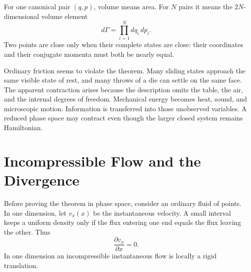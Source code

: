 For one canonical pair \((q,p)\), volume means area. For \(N\) pairs it means
the \(2N\)-dimensional volume element
\begin{equation}
 d\Gamma=\prod_{i=1}^{N}dq_i\,dp_i.
 \label{eq:l07-phase-volume-element}
\end{equation}
Two points are close only when their complete states are close: their
coordinates and their conjugate momenta must both be nearly equal.

\begin{classroomqa}
\end{classroomqa}

Ordinary friction seems to violate the theorem. Many sliding states approach
the same visible state of rest, and many throws of a die can settle on the
same face. The apparent contraction arises because the description omits the
table, the air, and the internal degrees of freedom. Mechanical energy becomes
heat, sound, and microscopic motion. Information is transferred into those
unobserved variables. A reduced phase space may contract even though the
larger closed system remains Hamiltonian.

\begin{classroomqa}
\end{classroomqa}

\section{Incompressible Flow and the Divergence}

Before proving the theorem in phase space, consider an ordinary fluid of
points. In one dimension, let \(v_x(x)\) be the instantaneous velocity. A
small interval keeps a uniform density only if the flux entering one end
equals the flux leaving the other. Thus
\begin{equation}
 \frac{\partial v_x}{\partial x}=0.
 \label{eq:l07-one-dimensional-incompressibility}
\end{equation}
In one dimension an incompressible instantaneous flow is locally a rigid
translation.

